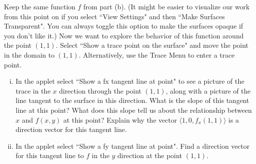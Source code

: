 \begin{pa}
\begin{comment}
\end{comment}

        \item Keep the same function $f$ from part (b). (It might be easier to visualize our work from this point on if you select ``View Settings" and then ``Make Surfaces Transparent". You can always toggle this option to make the surfaces opaque if you don't like it.) Now we want to explore the behavior of this function around the point $(1,1)$. Select ``Show a trace point on the surface" and move the point in the domain to $(1,1)$. Alternatively, use the Trace Menu to enter a trace point.
        \begin{enumerate}[i.]
        \item In the applet select ``Show a fx tangent line at point" to see a picture of the trace in the $x$ direction through the point $(1,1)$, along with a picture of the line tangent to the surface in this direction. What is the slope of this tangent line at this point? What does this slope tell us about the relationship between $x$ and $f(x,y)$ at this point? Explain why the vector $\langle 1,0,f_x(1,1) \rangle$ is a direction vector for this tangent line.



\begin{comment}

The slope of this tangent line is $f_x(1,1) = 2x\bigm|_{(1,1)} = 2$. This slope tells us how the $f$ values on the tangent line change for every one unit increase in $x$ from this point, keeping $y$ constant. So if we keep $y$ constant and increase $x$ by 1, $f$ increases by $f_x(1,1)$. This means that the vector $\langle 1,0,f_x(1,1) \rangle$ is a direction vector for this tangent line.



\end{comment}

         \item In the applet select ``Show a fy tangent line at point". Find a direction vector for this tangent line to $f$ in the $y$ direction at the point $(1,1)$.



\begin{comment}

The slope of this tangent line is $f_y(1,1) = -2y\bigm|_{(1,1)} = -2$, so, by the same reasoning as in the previous part, the vector $\langle 0,1,f_y(1,1) \rangle$ is a direction vector for this tangent line.




\end{comment}
\end{enumerate}
\end{pa}
